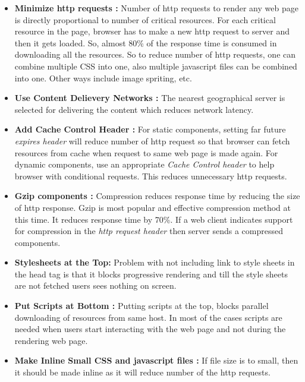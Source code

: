 \documentclass[conference]{IEEEtran}
\begin{document}
\begin{itemize}
\item \textbf{Minimize http requests :}
Number of http requests to render any web page is directly proportional to
number of critical resources.
For each critical resource in the page, browser has to make a new http request 
to server and then it gets loaded. So, almost 80\% of the response time is
consumed in downloading all the resources. So to reduce number of http
requests, one can combine multiple CSS into one, also multiple javascript files can
be combined into one. Other ways include image spriting, etc.

\item \textbf{Use Content Delievery Networks :}
The nearest geographical server is selected for delivering the content which reduces network latency.

\item \textbf{Add Cache Control Header :}
For static components, setting far future {\it expires header} will reduce number of http request
so that browser can fetch resources from cache when request to same web page is made again.
For dynamic components, use an appropriate {\it Cache Control header} to help browser
with conditional requests. This reduces unnecessary http requests.

\item \textbf{Gzip components :}
Compression reduces response time by reducing the size of http response.
Gzip is most popular and effective compression method at this time. It reduces
response time by 70\%. If a web client indicates support for compression in
the {\it http request header} then server sends a compressed components.

\item \textbf{Stylesheets at the Top: }
Problem with not including link to style sheets in the head tag is that it blocks
progressive rendering and till the style sheets are not fetched users sees nothing
on screen.

\item \textbf{Put Scripts at Bottom :}
Putting scripts at the top, blocks parallel downloading of resources from same host.
In most of the cases scripts are needed when users start interacting with the web page and not during the rendering web page. 

\item \textbf{Make Inline Small CSS and javascript files :}
If file size is to small, then it should be made inline as it will reduce number
of the http requests.


\end{itemize}
\end{document}

